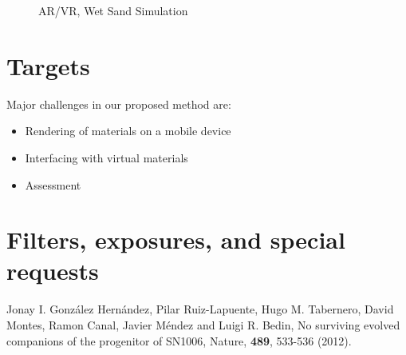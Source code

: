 \documentclass[dvips,12pt]{article}
\begin{document}
\begin{figure}
\begin{center}
\end{center}

\caption{AR/VR, Wet Sand Simulation}

\end{figure}


\section{Targets}

Major challenges in our proposed method are:

\begin{itemize}
\item Rendering of materials on a mobile device
\item Interfacing with virtual materials
\item Assessment
\end{itemize}




\section{Filters, exposures, and special requests}


 
\begin{thebibliography}{99}

 Jonay I. Gonz\'{a}lez Hern\'{a}ndez, 
Pilar Ruiz-Lapuente,	
Hugo M. Tabernero,	
David Montes,	
Ramon Canal,	
Javier M\'{e}ndez	
and Luigi R. Bedin,
{No surviving evolved companions of the progenitor of SN1006},
Nature, {\bf 489}, 533-536 (2012).

\end{thebibliography}
\end{document}
